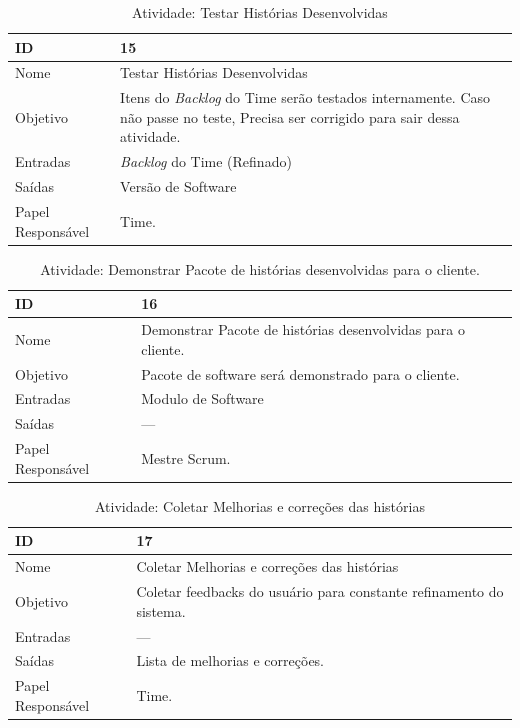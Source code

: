     \begin{table}[H]
      \centering
        \begin{tabular}{| m{5em} | m{10cm} |}
          \hline
          ID       & 15   \\ \hline
          Nome     & Testar Histórias Desenvolvidas  \\ \hline
          Objetivo & Itens do \textit{Backlog} do Time serão testados internamente. Caso não passe no teste, Precisa ser corrigido para sair dessa atividade.  \\ \hline
          Entradas & \textit{Backlog} do Time (Refinado)\\ \hline
          Saídas   & Versão de Software \\ \hline
          Papel Responsável   & Time. \\ \hline
        \end{tabular}
        \caption{Atividade: Testar Histórias Desenvolvidas}
        \label{tabela:atividade15}
    \end{table}

    \begin{table}[H]
      \centering
        \begin{tabular}{| m{5em} | m{10cm} |}
          \hline
          ID       & 16   \\ \hline
          Nome     & Demonstrar Pacote de histórias desenvolvidas para o cliente. \\ \hline
          Objetivo & Pacote de software será demonstrado para o cliente. \\ \hline
          Entradas & Modulo de Software\\ \hline
          Saídas   &  --- \\ \hline
          Papel Responsável   & Mestre Scrum. \\ \hline
        \end{tabular}
        \caption{Atividade: Demonstrar Pacote de histórias desenvolvidas para o cliente.}
        \label{tabela:atividade16}
    \end{table}

    \begin{table}[H]
      \centering
        \begin{tabular}{| m{5em} | m{10cm} |}
          \hline
          ID       & 17   \\ \hline
          Nome     & Coletar Melhorias e correções das histórias  \\ \hline
          Objetivo & Coletar feedbacks do usuário para constante refinamento do sistema.  \\ \hline
          Entradas & ---\\ \hline
          Saídas   & Lista de melhorias e correções. \\ \hline
          Papel Responsável   & Time. \\ \hline
        \end{tabular}
        \caption{Atividade: Coletar Melhorias e correções das histórias}
        \label{tabela:atividade17}
    \end{table}



